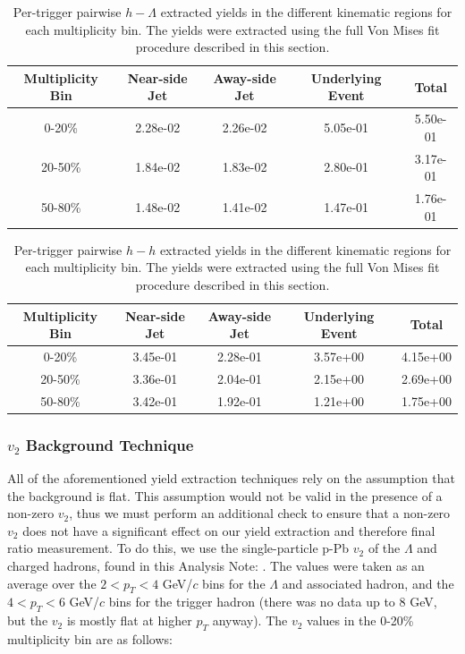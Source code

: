 \documentclass[ALICE,manyauthors]{ALICE_analysis_notes}
\begin{document}
\begin{table}[h!]
\centering
\begin{tabular}{| c | c | c | c | c | }
\hline
Multiplicity Bin & Near-side Jet & Away-side Jet & Underlying Event & Total  \\
\hline
	
0-20\% & 2.28e-02  & 2.26e-02  & 5.05e-01 & 5.50e-01 \\
20-50\% & 1.84e-02 & 1.83e-02  & 2.80e-01 & 3.17e-01 \\
50-80\% & 1.48e-02 & 1.41e-02  & 1.47e-01 & 1.76e-01 \\
	
\hline
\end{tabular}
\caption{Per-trigger pairwise $h-\Lambda$ extracted yields in the different kinematic regions for each multiplicity bin. The yields were extracted using the full Von Mises fit procedure described in this section.}
\label{h_lambda_yield_table_vonfit}
\end{table}
	
\begin{table}[h!]
\centering
\begin{tabular}{| c | c | c | c | c | }
\hline
Multiplicity Bin & Near-side Jet & Away-side Jet & Underlying Event & Total  \\
\hline

0-20\% & 3.45e-01  & 2.28e-01  & 3.57e+00 & 4.15e+00 \\
20-50\% & 3.36e-01 & 2.04e-01  & 2.15e+00 & 2.69e+00 \\
50-80\% & 3.42e-01 & 1.92e-01  & 1.21e+00 & 1.75e+00 \\

\hline
\end{tabular}
\caption{Per-trigger pairwise $h-h$ extracted yields in the different kinematic regions for each multiplicity bin. The yields were extracted using the full Von Mises fit procedure described in this section.}
\label{h_h_yield_table_vonfit}
\end{table}


\subsubsection{$v_{2}$ Background Technique}
\label{v2_background_technique}
All of the aforementioned yield extraction techniques rely on the assumption that the background is flat. This assumption would not be valid in the presence of a non-zero $v_{2}$, thus we must perform an additional check to ensure that a non-zero $v_{2}$ does not have a significant effect on our yield extraction and therefore final ratio measurement. To do this, we use the single-particle p-Pb $v_{2}$ of the $\Lambda$ and charged hadrons, found in this Analysis Note: \cite{ANALYSIS_NOTE_V2}. The values were taken as an average over the $2 < p_{T} < 4$ GeV/$c$ bins for the $\Lambda$ and associated hadron, and the $4 < p_{T} < 6$ GeV/$c$ bins for the trigger hadron (there was no data up to 8 GeV, but the $v_{2}$ is mostly flat at higher $p_{T}$ anyway). The $v_{2}$ values in the 0-20\% multiplicity bin are as follows:
\end{document}
